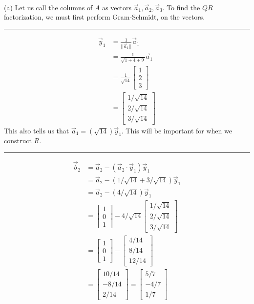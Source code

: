 \documentclass{report}
\begin{document}
\sol \\
(a) Let us call the columns of $A$ as vectors $\vec{a}_1,  \vec{a}_2,  \vec{a}_3$. To find the $QR$ factorization,  we must first perform Gram-Schmidt,  on the vectors.
\vspace{0.5em}
\hrule
\vspace{0.5em}
$$
\begin{aligned}
\vec{y}_1 &= \frac{1}{||\vec{a}_1||}\vec{a}_1\\
&= \frac{1}{\sqrt{1+4+9}}\vec{a}_1\\
&=\frac{1}{\sqrt{14}}\begin{bmatrix}1\\2\\3\end{bmatrix}\\
&=\begin{bmatrix}1/\sqrt{14}\\2/\sqrt{14}\\3/\sqrt{14}\end{bmatrix}
\end{aligned}
$$
This also tells us that $\vec{a}_1 = (\sqrt{14})\vec{y}_1$.  This will be important for when we construct $R$.
\vspace{0.5em}
\hrule
\vspace{0.5em}
\begin{minipage}{0.45\textwidth}
$$
\begin{aligned}
\vec{b}_2 &= \vec{a}_2 - (\vec{a}_2 \cdot \vec{y}_1)\vec{y}_1\\
&=\vec{a}_2 - (1/\sqrt{14} + 3/\sqrt{14})\vec{y}_1\\
&=\vec{a}_2 - (4/\sqrt{14})\vec{y}_1\\
&=\begin{bmatrix}1\\0\\1\end{bmatrix} - 4/\sqrt{14}\begin{bmatrix}1/\sqrt{14}\\2/\sqrt{14}\\3/\sqrt{14}\end{bmatrix}\\
&=\begin{bmatrix}1\\0\\1\end{bmatrix} - \begin{bmatrix}4/14\\8/14\\12/14\end{bmatrix}\\
&=\begin{bmatrix}10/14\\-8/14\\2/14\end{bmatrix} = \begin{bmatrix}5/7\\-4/7\\1/7\end{bmatrix}
\end{aligned}
$$
\end{minipage}
\end{document}
